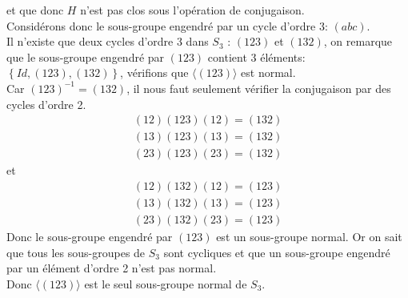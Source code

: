 \documentclass[11pt, a4paper, twoside]{article}
\begin{document}
et que donc $H$ n'est pas clos sous l'opération de conjugaison.\\
Considérons donc le sous-groupe engendré par un cycle d'ordre 3: $( abc) $.\\
Il n'existe que deux cycles d'ordre 3 dans $S_3$ : $( 123) $ et $( 132) $, on remarque que le sous-groupe engendré par $( 123) $ contient 3 éléments: $ \left\{ Id, ( 123) ,( 132)\right\} $, vérifions que $\langle ( 123) \rangle$ est normal.\\
Car $( 123)^{-1}= ( 132)  $, il nous faut seulement vérifier la conjugaison par des cycles d'ordre 2.
\begin{align*}
	( 12) ( 123) ( 12) = ( 132) \\
	( 13) ( 123) ( 13) = ( 132) \\
	( 23) ( 123) ( 23) = ( 132)
\end{align*}
et
\begin{align*}
	( 12) ( 132) ( 12) = ( 123) \\
	( 13) ( 132) ( 13) = ( 123) \\
	( 23) ( 132) ( 23) = ( 123)
\end{align*}
Donc le sous-groupe engendré par $( 123) $ est un sous-groupe normal. Or on sait que tous les sous-groupes de $S_3$ sont cycliques et que un sous-groupe engendré par un élément d'ordre 2 n'est pas normal.\\
Donc $\langle ( 123) \rangle$ est le seul sous-groupe normal de $S_3$.\\
\end{document}
